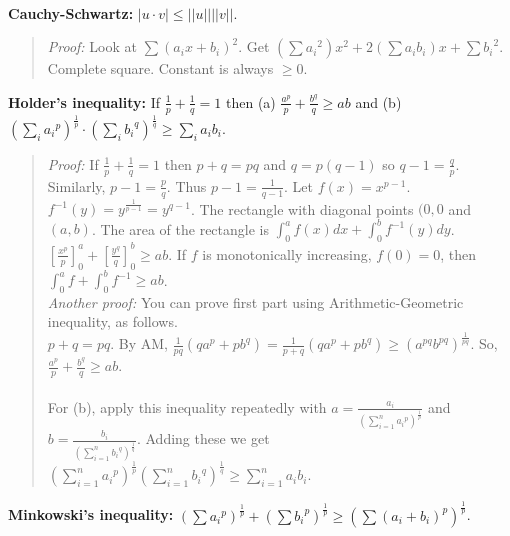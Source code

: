 \\
{\bf Cauchy-Schwartz:} $|u \cdot v|  \leq ||u|| ||v||$.
\begin{quote}
\emph{Proof:} Look at
$\sum (a_i x + b_i )^2$.  Get $(\sum {a_i}^2)x^2 + 2 (\sum a_i b_i) x +
\sum {b_i}^2$.  Complete square. Constant is always $\geq 0$.
\end{quote}
{\bf Holder's inequality:}
If ${\frac {1} {p}} + {\frac {1} {q}} = 1$ then (a)
${\frac {a^p} {p}} + {\frac {b^q} {q}} \geq ab$ and
(b) $(\sum_{i} {a_i}^p )^{\frac 1 p} \cdot (\sum_{i} {b_i}^q )^{\frac 1 q}  \geq
\sum_{i} a_i b_i $.
\begin{quote}
\emph{Proof:} If ${\frac {1} {p}} + {\frac {1} {q}} = 1$ then $p + q =pq$ and $q=p(q-1)$
so $q-1= {\frac q p}$.  Similarly, $p-1= {\frac p q}$.  Thus $p-1 = {\frac 1 {q-1}}$.
Let $f(x)= x^{p-1}$.  $f^{-1}(y) = y^{\frac 1 {p-1}}=y^{q-1}$.  The rectangle with diagonal
points $(0,0$ and $(a,b)$.  The area of the rectangle is $\int_0^a f(x) dx + \int_0^b f^{-1}(y) dy$.
$[{\frac {x^p} p}]_0^a + [{\frac {y^q} q}]_0^b \geq ab$.
If $f$ is
monotonically increasing, $f(0)= 0$, then $\int_0^a f + \int_0^b f^{-1} \geq
ab$.
\\
\emph{Another proof:}  You can prove first part using Arithmetic-Geometric inequality, as follows.
\\
$p+q=pq$.  By AM, ${\frac 1 {pq}} (qa^p + p b^q)={\frac 1 {p+q}} (qa^p + p b^q) \geq (a^{pq}b^{pq})^{\frac 1 {pq}}$.
So, ${\frac {a^p} {p}} + {\frac {b^q} {q}} \geq ab$.
\\
\\
For (b), apply this inequality repeatedly with
$a= {\frac {a_{i}} {(\sum_{i=1}^n {a_i}^p)^{\frac 1 p}}}$ and
$b= {\frac {b_{i}} {(\sum_{i=1}^n {b_i}^q)^{\frac 1 q}}}$.  Adding these we get
$(\sum_{i=1}^n {{a_i}^p})^{\frac 1 p}
(\sum_{i=1}^n {{b_i}^q})^{\frac 1 q} \geq
\sum_{i=1}^n a_i b_i$.
\end{quote}
{\bf Minkowski's inequality:}
$(\sum {a_i}^p )^{\frac 1 p} +
(\sum {b_i}^p )^{\frac 1 p} \geq (\sum (a_i + b_i )^p )^{\frac 1 p}$.
